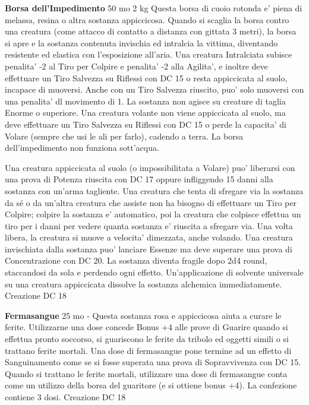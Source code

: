 \documentclass[a4paper,11pt,twoside,openany]{dndbook}
\begin{document}
{\textbf{Borsa dell'Impedimento} 50 mo 2 kg Questa borsa di cuoio rotonda e' piena di melassa, resina o altra sostanza appiccicosa. Quando si scaglia la borsa contro una creatura (come attacco di contatto a distanza con gittata 3 metri), la borsa si apre e la sostanza contenuta invischia ed intralcia la vittima, diventando resistente ed elastica con l'esposizione all'aria. Una creatura Intralciata subisce penalita' -2 al Tiro per Colpire e penalita' -2 alla Agilita', e inoltre deve effettuare un Tiro Salvezza su Riflessi con DC 15 o resta appiccicata al suolo, incapace di muoversi. Anche con un Tiro Salvezza riuscito, puo' solo muoversi con una penalita' dl movimento di 1.
La sostanza non agisce su creature di taglia Enorme o superiore. Una creatura volante non viene appiccicata al suolo, ma deve effettuare un Tiro Salvezza su Riflessi con DC 15 o perde la capacita' di Volare (sempre che usi le ali per farlo), cadendo a terra. La borsa dell'impedimento non funziona sott'acqua.

Una creatura appiccicata al suolo (o impossibilitata a Volare) puo' liberarsi con una prova di Potenza riuscita con DC 17 oppure infliggendo 15 danni alla sostanza con un'arma tagliente. Una creatura che tenta di sfregare via la sostanza da sé o da un'altra creatura che assiste non ha bisogno di effettuare un Tiro per Colpire; colpire la sostanza e' automatico, poi la creatura che colpisce effettua un tiro per i danni per vedere quanta sostanza e' riuscita a sfregare via. Una volta libera, la creatura si muove a velocita' dimezzata, anche volando. Una creatura invischiata dalla sostanza puo' lanciare Essenze ma deve superare una prova di Concentrazione con DC 20. La sostanza diventa fragile dopo 2d4 round, staccandosi da sola e perdendo ogni effetto. Un'applicazione di solvente universale su una creatura appiccicata dissolve la sostanza alchemica immediatamente. Creazione DC 18

\textbf{Fermasangue} 25 mo - Questa sostanza rosa e appiccicosa aiuta a curare le ferite. Utilizzarne una dose concede Bonus +4 alle prove di Guarire quando si effettua pronto soccorso, si guariscono le ferite da tribolo ed oggetti simili o si trattano ferite mortali. Una dose di fermasangue pone termine ad un effetto di Sanguinamento come se si fosse superata una prova di Sopravvivenza con DC 15. Quando si trattano le ferite mortali, utilizzare una dose di fermasangue conta come un utilizzo della borsa del guaritore (e si ottiene bonus +4). La confezione contiene 3 dosi. Creazione DC 18

}
\end{document}
